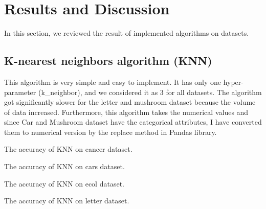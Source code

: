\vspace{2cm}
\section{ Results and Discussion}
\vspace{2cm}

In this section, we reviewed the result of implemented algorithms on datasets.






\subsection{K-nearest neighbors algorithm (KNN)}
This algorithm is very simple and easy to implement. It has only one hyper-parameter (k\_neighbor), and we considered it as 3 for all datasets. The algorithm got significantly slower for the letter and mushroom dataset because the volume of data increased. Furthermore, this algorithm takes the numerical values and since Car and Mushroom dataset have the categorical attributes, I have converted them to numerical version by the replace method in Pandas library. 

\begin{table}[H]
\centering
\caption{The accuracy of KNN on cancer dataset.}
\label{tab:tab_knn_canc}

\end{table}

\begin{table}[H]
\centering
\caption{The accuracy of KNN on cars dataset.}
\label{tab:tab_knn_cars}

\end{table}

\begin{table}[H]
\centering
\caption{The accuracy of KNN on ecol dataset.}
\label{tab:tab_knn_ecol}

\end{table}

\begin{table}[H]
\centering
\caption{The accuracy of KNN on letter dataset.}
\label{tab:tab_knn_letter}

\end{table}

